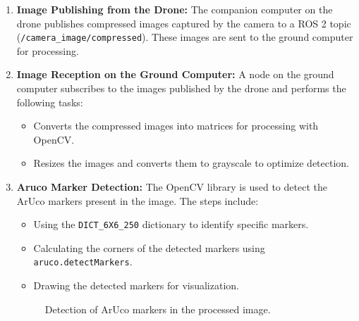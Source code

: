     \begin{enumerate}
        \item \textbf{Image Publishing from the Drone:} 
        The companion computer on the drone publishes compressed images captured by the camera to a ROS 2 topic (\texttt{/camera\_image/compressed}). These images are sent to the ground computer for processing.
    
        \item \textbf{Image Reception on the Ground Computer:} 
        A node on the ground computer subscribes to the images published by the drone and performs the following tasks:
        \begin{itemize}
            \item Converts the compressed images into matrices for processing with OpenCV.
            \item Resizes the images and converts them to grayscale to optimize detection.
        \end{itemize}
    
        \item \textbf{Aruco Marker Detection:} 
        The OpenCV library is used to detect the ArUco markers present in the image. The steps include:
        \begin{itemize}
            \item Using the \texttt{DICT\_6X6\_250} dictionary to identify specific markers.
            \item Calculating the corners of the detected markers using \texttt{aruco.detectMarkers}.
            \item Drawing the detected markers for visualization.
        \end{itemize}
        \begin{center}
            \begin{figure}[H]
                \centering
                \caption{Detection of ArUco markers in the processed image.}
            \end{figure}
        \end{center}
    

\end{enumerate}
